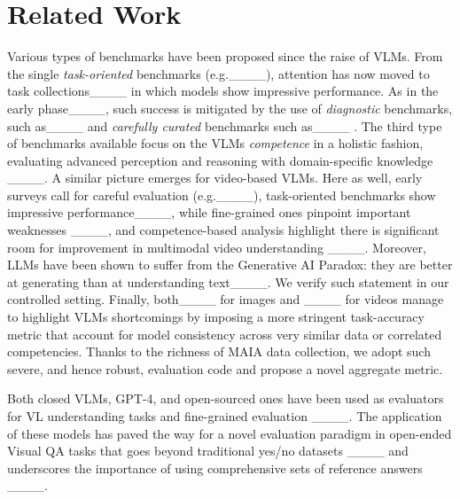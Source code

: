 \section{Related Work}
\label{sec:related_work}





Various types of benchmarks have been proposed since the raise of VLMs. From the single \emph{task-oriented} benchmarks (e.g.____), attention has now moved to task collections____ in which models show impressive performance. As in the early phase____, such success is mitigated by the use of \emph{diagnostic} benchmarks, such as____ and \emph{carefully curated} benchmarks such as____ . The third type of benchmarks available focus on the VLMs \emph{competence} in a holistic fashion,  evaluating advanced perception and reasoning with domain-specific knowledge ____. A similar picture emerges for video-based VLMs. Here as well, early surveys call for careful evaluation (e.g.____), task-oriented benchmarks show impressive performance____, while fine-grained ones pinpoint important weaknesses ____, and competence-based analysis highlight there is significant room for improvement in multimodal video understanding ____. Moreover, LLMs have been shown to suffer from the Generative AI Paradox: they are better at generating than at understanding text____. We verify such statement in our controlled setting.  Finally, both____ for images and ____ for videos manage to highlight VLMs shortcomings by imposing a more stringent task-accuracy metric that account for model consistency across very similar data or correlated competencies. Thanks to the richness of MAIA data collection, we adopt such severe, and hence robust, evaluation code and propose a novel aggregate metric.


Both closed VLMs, GPT-4, and open-sourced ones have been used as evaluators for VL understanding tasks and fine-grained evaluation ____. The application of these models has paved the way for a novel evaluation paradigm in open-ended Visual QA tasks that goes beyond traditional yes/no datasets ____ and underscores the importance of using comprehensive sets of reference answers ____. 

